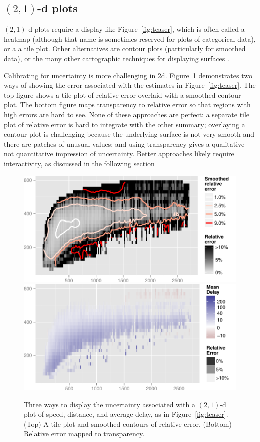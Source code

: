 \documentclass[journal]{vgtc}                %
\begin{document}
\subsection{\texorpdfstring{$(2,1)$}{(2, 1)}-d plots}
\label{sub:2d-plots}

$(2, 1)$-d plots require a display like Figure~\ref{fig:teaser}, which is often called a heatmap \citep{wilkinson:2009} (although that name is sometimes reserved for plots of categorical data), or a a tile plot. Other alternatives are contour plots (particularly for smoothed data), or the many other cartographic techniques for displaying surfaces \citep{kennelly:2002}.

Calibrating for uncertainty is more challenging in 2d. Figure~\ref{fig:2d-error} demonstrates two ways of showing the error associated with the estimates in Figure~\ref{fig:teaser}. The top figure shows a tile plot of relative error overlaid with a smoothed contour plot. The bottom figure maps transparency to relative error so that regions with high errors are hard to see. None of these approaches are perfect: a separate tile plot of relative error is hard to integrate with the other summary; overlaying a contour plot is challenging because the underlying surface is not very smooth and there are patches of unusual values; and using transparency gives a qualitative not quantitative impression of uncertainty. Better approaches likely require interactivity, as discussed in the following section

\begin{figure}
  \centering
   \includegraphics[width=\linewidth]{2d-error}
   \includegraphics[width=\linewidth]{2d-alpha}
 \caption{Three ways to display the uncertainty associated with a $(2,1)$-d plot of speed, distance, and average delay, as in Figure~\ref{fig:teaser}. (Top) A tile plot and smoothed contours of relative error. (Bottom) Relative error mapped to transparency.}
 \label{fig:2d-error}
\end{figure}
\end{document}

